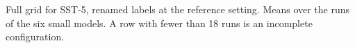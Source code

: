 \begin{table}[t]
  \centering
  \footnotesize
  
  \caption{Full grid for SST-5, renamed labels at the reference setting. Means over the runs of the six small models. A row with fewer than 18 runs is an incomplete configuration.}
  \label{tab:grid_sst_relabel}
\end{table}
